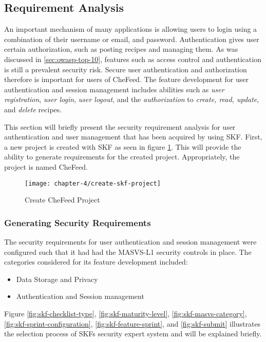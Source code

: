 \subsection{Requirement Analysis}
An important mechanism of many applications is allowing users to login using a combination of their username or email, and password. Authentication gives user certain authorization, such as posting recipes and managing them. As was discussed in \ref{sec:owasp-top-10}, features such as access control and authentication is still a prevalent security risk. Secure user authentication and authorization therefore is important for users of CheFeed. The feature development for user authentication and session management includes abilities such as \emph{user registration}, \emph{user login}, \emph{user logout}, and the \emph{authorization} to \emph{create, read, update}, and \emph{delete} recipes.

This section will briefly present the security requirement analysis for user authentication and user management that has been acquired by using SKF. First, a new project is created with SKF as seen in figure \ref{fig:chefeed-project}. This will provide the ability to generate requirements for the created project. Appropriately, the project is named CheFeed.

\begin{figure}
    \texttt{[image: chapter-4/create-skf-project]}
    \caption{Create CheFeed Project}
    \label{fig:chefeed-project}
\end{figure}

\subsubsection{Generating Security Requirements}
The security requirements for user authentication and session management were configured such that it had had the MASVS-L1 security controls in place. The categories considered for its feature development included:
\begin{itemize}
    \item Data Storage and Privacy
    \item Authentication and Session management
\end{itemize}
Figure \ref{fig:skf-checklist-type}, \ref{fig:skf-maturity-level}, \ref{fig:skf-masvs-category}, \ref{fig:skf-sprint-configuration}, \ref{fig:skf-feature-sprint}, and \ref{fig:skf-submit} illustrates the selection process of SKFs security expert system and will be explained briefly.

